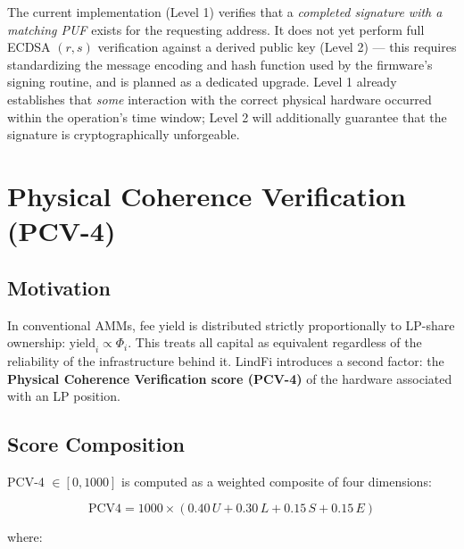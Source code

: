 \documentclass[11pt,a4paper]{article}
\begin{document}
The current implementation (Level 1) verifies that a \emph{completed signature with a matching PUF} exists for the requesting address. It does not yet perform full ECDSA $(r,s)$ verification against a derived public key (Level 2) --- this requires standardizing the message encoding and hash function used by the firmware's signing routine, and is planned as a dedicated upgrade. Level 1 already establishes that \emph{some} interaction with the correct physical hardware occurred within the operation's time window; Level 2 will additionally guarantee that the signature is cryptographically unforgeable.

\section{Physical Coherence Verification (PCV-4)}
\label{sec:pcv4}

\subsection{Motivation}

In conventional AMMs, fee yield is distributed strictly proportionally to LP-share ownership: $\text{yield}_i \propto \Phi_i$. This treats all capital as equivalent regardless of the reliability of the infrastructure behind it. LindFi introduces a second factor: the \textbf{Physical Coherence Verification score (PCV-4)} of the hardware associated with an LP position.

\subsection{Score Composition}

PCV-4 $\in [0, 1000]$ is computed as a weighted composite of four dimensions:

\begin{equation}
    \text{PCV4} = 1000 \times \left( 0.40\,U + 0.30\,L + 0.15\,S + 0.15\,E \right)
    \label{eq:pcv4}
\end{equation}

where:
\end{document}
